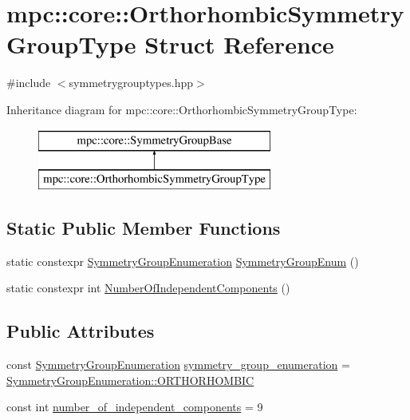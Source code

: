 \hypertarget{structmpc_1_1core_1_1_orthorhombic_symmetry_group_type}{}\section{mpc\+:\+:core\+:\+:Orthorhombic\+Symmetry\+Group\+Type Struct Reference}
\label{structmpc_1_1core_1_1_orthorhombic_symmetry_group_type}


{\ttfamily \#include $<$symmetrygrouptypes.\+hpp$>$}

Inheritance diagram for mpc\+:\+:core\+:\+:Orthorhombic\+Symmetry\+Group\+Type\+:\begin{figure}[H]
\begin{center}
\leavevmode
\includegraphics[height=2.000000cm]{structmpc_1_1core_1_1_orthorhombic_symmetry_group_type}
\end{center}
\end{figure}
\subsection*{Static Public Member Functions}
\begin{DoxyCompactItemize}
\item 
static constexpr \mbox{\hyperlink{namespacempc_1_1core_a9d979684062547055a0ef5c13077bad8}{Symmetry\+Group\+Enumeration}} \mbox{\hyperlink{structmpc_1_1core_1_1_orthorhombic_symmetry_group_type_ae206dd0d79d73340db34a885e9cf704f}{Symmetry\+Group\+Enum}} ()
\item 
static constexpr int \mbox{\hyperlink{structmpc_1_1core_1_1_orthorhombic_symmetry_group_type_a3b3d8e62305c30e53908d1cc1f20cdd2}{Number\+Of\+Independent\+Components}} ()
\end{DoxyCompactItemize}
\subsection*{Public Attributes}
\begin{DoxyCompactItemize}
\item 
const \mbox{\hyperlink{namespacempc_1_1core_a9d979684062547055a0ef5c13077bad8}{Symmetry\+Group\+Enumeration}} \mbox{\hyperlink{structmpc_1_1core_1_1_orthorhombic_symmetry_group_type_a5addc9fcd622f1b527ac18ba01d01d19}{symmetry\+\_\+group\+\_\+enumeration}} = \mbox{\hyperlink{namespacempc_1_1core_a9d979684062547055a0ef5c13077bad8a45ddba8b47424b406a313caed88b091a}{Symmetry\+Group\+Enumeration\+::\+O\+R\+T\+H\+O\+R\+H\+O\+M\+B\+IC}}
\item 
const int \mbox{\hyperlink{structmpc_1_1core_1_1_orthorhombic_symmetry_group_type_a067248ba419b3c6f3d807d9a06c92062}{number\+\_\+of\+\_\+independent\+\_\+components}} = 9
\end{DoxyCompactItemize}


